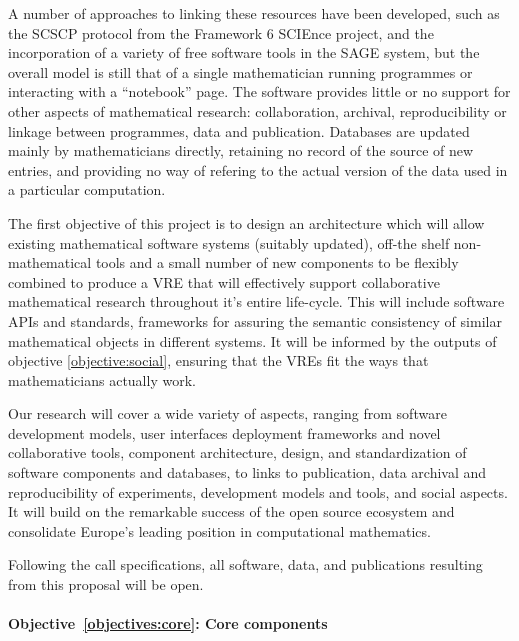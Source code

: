 \documentclass[a4paper,11pt]{article}
\begin{document}
A number of approaches to linking these resources have been developed,
such as the SCSCP protocol from the Framework 6 SCIEnce project, and
the incorporation of a variety of free software tools in the SAGE
system, but the overall model is still that of a single mathematician
running programmes or interacting with a ``notebook''
page. The software provides little or no support for other aspects of
mathematical research: collaboration,
archival, reproducibility or linkage between programmes, data and
publication. Databases are updated mainly by mathematicians directly,
retaining no record of the source of new entries, and providing no way
of refering to the actual version of the data used in a particular
computation.

The first objective of this project is to design an architecture which
will allow existing mathematical software systems (suitably updated), 
off-the shelf non-mathematical tools and a small number of new
components to be flexibly combined to produce a VRE that will
effectively support collaborative mathematical research throughout
it's entire life-cycle. This will include software APIs and standards,
frameworks for assuring the semantic consistency of similar
mathematical objects in different systems.  It will be informed by the
outputs of objective \ref{objective:social}, ensuring that the VREs
fit the ways that mathematicians actually work.


Our research will cover a wide variety of aspects, ranging from
software development models, user interfaces   deployment frameworks and novel collaborative tools,
component architecture, design, and standardization of software
components and databases, to links to publication, data archival and
reproducibility of experiments, development models and tools, and
social aspects. It will build on the remarkable success of the open
source ecosystem and consolidate Europe's leading position in
computational mathematics.

Following the call specifications, all software, data, and
publications resulting from this proposal will be open.



\paragraph{Objective~\ref{objectives:core}: Core components}\
\end{document}
